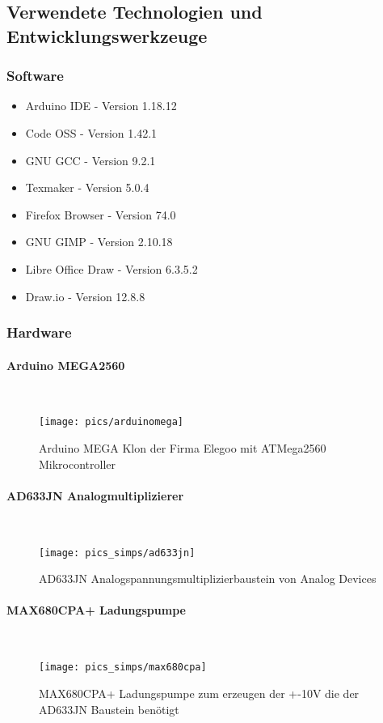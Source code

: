 \documentclass[12pt,a4paper]{article}
\begin{document}
\subsection{Verwendete Technologien und Entwicklungswerkzeuge}
\subsubsection*{Software}
\begin{itemize}
\item Arduino IDE - Version 1.18.12
\item Code OSS - Version 1.42.1
\item GNU GCC - Version 9.2.1
\item Texmaker - Version 5.0.4
\item Firefox Browser - Version 74.0
\item GNU GIMP - Version 2.10.18
\item Libre Office Draw - Version 6.3.5.2
\item Draw.io - Version 12.8.8
\end{itemize}
%
\vspace{10mm}
\subsubsection*{Hardware}
%
\paragraph{Arduino MEGA2560}\mbox{}\\
\begin{figure}[h!]
	\centering
	\texttt{[image: pics/arduinomega]}
	\caption{Arduino MEGA Klon der Firma Elegoo mit ATMega2560 Mikrocontroller}
\end{figure}
%
%
\newpage
\paragraph{AD633JN Analogmultiplizierer}\mbox{}\\
\begin{figure}[h!]
	\centering
	\texttt{[image: pics\_simps/ad633jn]}
	\caption{AD633JN Analogspannungsmultiplizierbaustein von Analog Devices}
\end{figure}
%
\paragraph{MAX680CPA+ Ladungspumpe}\mbox{}\\
\begin{figure}[h!]
	\centering
	\texttt{[image: pics\_simps/max680cpa]}
	\caption{MAX680CPA+ Ladungspumpe zum erzeugen der +-10V die der AD633JN Baustein benötigt}
\end{figure}
%
%
\newpage
\end{document}
